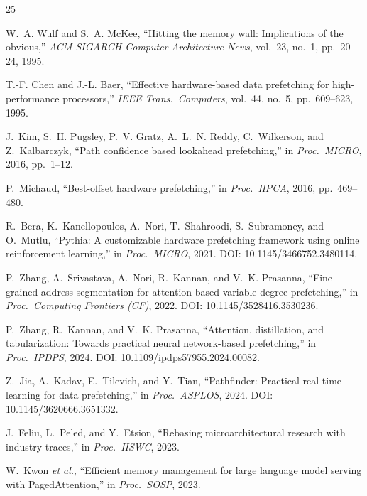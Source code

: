 \documentclass[conference]{IEEEtran}
\begin{document}


\begin{thebibliography}{25}

W.~A. Wulf and S.~A. McKee,
``Hitting the memory wall: Implications of the obvious,''
\emph{ACM SIGARCH Computer Architecture News}, vol.~23, no.~1, pp.~20--24, 1995.

T.-F. Chen and J.-L. Baer,
``Effective hardware-based data prefetching for high-performance processors,''
\emph{IEEE Trans.\ Computers}, vol.~44, no.~5, pp.~609--623, 1995.

J.~Kim, S.~H. Pugsley, P.~V. Gratz, A.~L.~N. Reddy, C.~Wilkerson, and Z.~Kalbarczyk,
``Path confidence based lookahead prefetching,''
in \emph{Proc.\ MICRO}, 2016, pp.~1--12.

P.~Michaud,
``Best-offset hardware prefetching,''
in \emph{Proc.\ HPCA}, 2016, pp.~469--480.

R.~Bera, K.~Kanellopoulos, A.~Nori, T.~Shahroodi, S.~Subramoney, and O.~Mutlu,
``Pythia: A customizable hardware prefetching framework using online reinforcement learning,''
in \emph{Proc.\ MICRO}, 2021.
\newblock DOI: 10.1145/3466752.3480114.

P.~Zhang, A.~Srivastava, A.~Nori, R.~Kannan, and V.~K. Prasanna,
``Fine-grained address segmentation for attention-based variable-degree prefetching,''
in \emph{Proc.\ Computing Frontiers (CF)}, 2022.
\newblock DOI: 10.1145/3528416.3530236.

P.~Zhang, R.~Kannan, and V.~K. Prasanna,
``Attention, distillation, and tabularization: Towards practical neural
network-based prefetching,''
in \emph{Proc.\ IPDPS}, 2024.
\newblock DOI: 10.1109/ipdps57955.2024.00082.

Z.~Jia, A.~Kadav, E.~Tilevich, and Y.~Tian,
``{Pathfinder}: Practical real-time learning for data prefetching,''
in \emph{Proc.\ ASPLOS}, 2024.
\newblock DOI: 10.1145/3620666.3651332.

J.~Feliu, L.~Peled, and Y.~Etsion,
``Rebasing microarchitectural research with industry traces,''
in \emph{Proc.\ IISWC}, 2023.

W.~Kwon \emph{et al.},
``Efficient memory management for large language model serving with {PagedAttention},''
in \emph{Proc.\ SOSP}, 2023.


\end{thebibliography}
\end{document}
